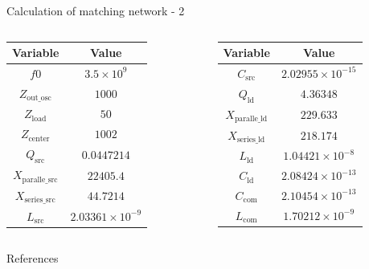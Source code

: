 \documentclass{beamer}
\begin{document}
\begin{frame}[fragile]{Calculation of matching network - 2}
\begin{columns}
  \begin{table}
    \centering
    \begin{tabular}{|c|c|}
        \hline
        \textbf{Variable} & \textbf{Value} \\
        \hline
        $f0$ & $3.5 \times 10^9$ \\
        $Z_{\text{out\_osc}}$ & $1000$ \\
        $Z_{\text{load}}$ & $50$ \\
        $Z_{\text{center}}$ & $1002$ \\
        $Q_{\text{src}}$ & $0.0447214$ \\
        $X_{\text{paralle\_src}}$ & $22405.4$ \\
        $X_{\text{series\_src}}$ & $44.7214$ \\
        $L_{\text{src}}$ & $2.03361 \times 10^{-9}$ \\
        \hline
    \end{tabular}
  \end{table} 
  \begin{table}
    \centering
    \begin{tabular}{|c|c|}
        \hline
        \textbf{Variable} & \textbf{Value} \\
        \hline
        $C_{\text{src}}$ & $2.02955 \times 10^{-15}$ \\
        $Q_{\text{ld}}$ & $4.36348$ \\
        $X_{\text{paralle\_ld}}$ & $229.633$ \\
        $X_{\text{series\_ld}}$ & $218.174$ \\
        $L_{\text{ld}}$ & $1.04421 \times 10^{-8}$ \\
        $C_{\text{ld}}$ & $2.08424 \times 10^{-13}$ \\
        $C_{\text{com}}$ & $2.10454 \times 10^{-13}$ \\
        $L_{\text{com}}$ & $1.70212 \times 10^{-9}$ \\
        \hline
    \end{tabular}
  \end{table} 
\end{columns}

\end{frame}

\begin{frame}[allowframebreaks]{References}
  \nocite{*}
  
  
\end{frame} 
\end{document}
